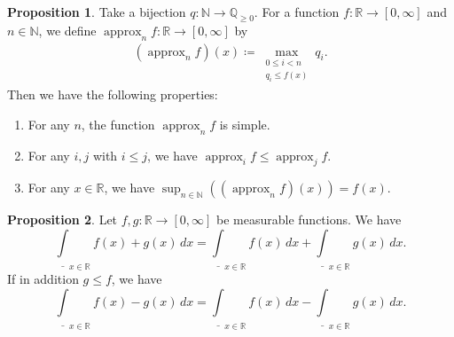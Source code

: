 \documentclass{article}
\theoremstyle{definition}
\newtheorem{theorem}{Theorem}[section]
\newtheorem{proposition}[theorem]{Proposition}
\DeclareMathOperator{\approxFun}{approx}
\begin{document}
\begin{proposition}
  Take a bijection $q : \mathbb{N} \to \mathbb{Q}_{\ge 0}$.
  For a function $f : \mathbb{R} \to [0, \infty]$
  and $n \in \mathbb{N}$, we define $\approxFun_n f : \mathbb{R} \to [0, \infty]$ by
  \begin{align*}
    (\approxFun_n f)(x) \coloneqq \max_{\substack{0 \le i < n \\ q_i \le f(x)}} q_i.
  \end{align*}
  Then we have the following properties:
  \begin{enumerate}
    \item For any $n$, the function $\approxFun_n f$ is simple.
    \item For any $i,j$ with $i \leq j$, we have
      $\approxFun_i f \leq \approxFun_j f$.
    \item For any $x \in \mathbb{R}$, we have $\sup_{n \in \mathbb{N}} ((\approxFun_n f) (x)) = f (x)$.
  \end{enumerate}
\end{proposition}

\begin{proposition}
  Let $f, g : \mathbb{R} \to [0, \infty]$ be measurable functions.
  We have 
  \begin{equation*}
    \underline{\int}_{x \in \mathbb{R}} f(x) + g(x) \, dx
      = \underline{\int}_{x \in \mathbb{R}} f(x) \, dx
        + \underline{\int}_{x \in \mathbb{R}} g(x) \, dx.
  \end{equation*}
  If in addition $g \leq f$, we have 
  \begin{equation*}
    \underline{\int}_{x \in \mathbb{R}} f(x) - g(x) \, dx
      = \underline{\int}_{x \in \mathbb{R}} f(x) \, dx
        - \underline{\int}_{x \in \mathbb{R}} g(x) \, dx.
  \end{equation*}
\end{proposition}

\end{document}
